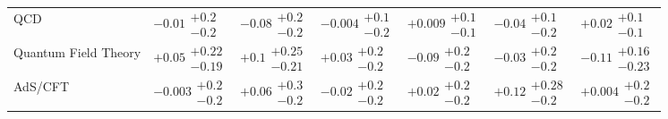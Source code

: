 \begin{table}[H]
\begin{tabular}{lllllll}
QCD & $-0.01\substack{+0.2 \\ -0.2}$ & $-0.08\substack{+0.2 \\ -0.2}$ & $-0.004\substack{+0.1 \\ -0.2}$ & $+0.009\substack{+0.1 \\ -0.1}$ & $-0.04\substack{+0.1 \\ -0.2}$ & $+0.02\substack{+0.1 \\ -0.1}$ \\
Quantum Field Theory & $+0.05\substack{+0.22 \\ -0.19}$ & $+0.1\substack{+0.25 \\ -0.21}$ & $+0.03\substack{+0.2 \\ -0.2}$ & $-0.09\substack{+0.2 \\ -0.2}$ & $-0.03\substack{+0.2 \\ -0.2}$ & $-0.11\substack{+0.16 \\ -0.23}$ \\
AdS/CFT & $-0.003\substack{+0.2 \\ -0.2}$ & $+0.06\substack{+0.3 \\ -0.2}$ & $-0.02\substack{+0.2 \\ -0.2}$ & $+0.02\substack{+0.2 \\ -0.2}$ & $+0.12\substack{+0.28 \\ -0.2}$ & $+0.004\substack{+0.2 \\ -0.2}$ \\
\bottomrule
\end{tabular}\normalsize\renewcommand{\arraystretch}{1}
\end{table}
